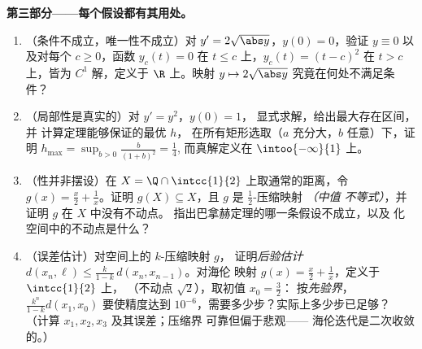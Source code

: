 \begin{problem}
\medskip
\noindent\textbf{第三部分——每个假设都有其用处。}
\begin{enumerate}[resume]
  \item （条件不成立，唯一性不成立）对 $y' =
        2\sqrt{\abs y}$，$y(0) = 0$，验证 $y \equiv 0$
        以及对每个 $c \geq 0$，函数 $y_c(t) = 0$ 在
        $t \leq c$ 上，$y_c(t) = (t - c)^2$ 在 $t > c$ 上，皆为
        $C^1$ 解，定义于 $\R$ 上。映射 $y \mapsto
        2\sqrt{\abs y}$ 究竟在何处不满足条件？
  \item （局部性是真实的）对 $y' = y^2$，$y(0) = 1$，
        显式求解，给出最大存在区间，并
        计算定理能够保证的最优 $h$，
        在所有矩形选取（$a$ 充分大，$b$ 任意）下，证明
        $h_{\max} = \sup_{b>0} \frac{b}{(1+b)^2} = \frac14$,
        而真解定义在 $\intoo{-\infty}{1}$ 上。
  \item （性并非摆设）在 $X = \Q \cap
        \intcc{1}{2}$ 上取通常的距离，令 $g(x) =
        \frac x2 + \frac1x$。证明 $g(X) \subseteq X$，且 $g$
        是 $\frac12$-压缩映射 \emph{（中值
        不等式）}，并证明 $g$ 在 $X$ 中没有不动点。
        指出巴拿赫定理的哪一条假设不成立，以及
        化空间中的不动点是什么？
  \item （误差估计）对空间上的 $k$-压缩映射 $g$，
        证明\emph{后验估计} $d(x_n,
        \ell) \leq \frac{k}{1-k}\,d(x_n, x_{n-1})$。对海伦
        映射 $g(x) = \frac x2 + \frac 1x$，定义于 $\intcc{1}{2}$ 上，
        （不动点 $\sqrt2$），取初值 $x_0 = \frac32$：
        按\emph{先验界}，
        $\frac{k^n}{1-k}d(x_1, x_0)$ 要使精度达到
        $10^{-6}$，需要多少步？实际上多少步已足够？
        （计算 $x_1, x_2, x_3$ 及其误差；压缩界
        可靠但偏于悲观——
        海伦迭代是二次收敛的。）
\end{enumerate}


\end{problem}
